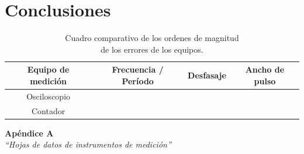 \documentclass{article}
\begin{document}
\section{Conclusiones}

\begin{table}[!hbt]
	\begin{center}
		\begin{tabular}{|c|c|c|c|} \hline
			\textbf{Equipo de medición} & \textbf{Frecuencia / Período} & \textbf{Desfasaje} & \textbf{Ancho de pulso} \\\hline
			Osciloscopio &  &  &  \\\hline
			Contador &  &  &  \\\hline
		\end{tabular}

	\caption{Cuadro comparativo de los ordenes de magnitud\\ de los errores de los equipos.}
	\end{center}
\end{table}
\medskip
	


\newpage \textit{}
\newpage



\newpage
\vspace*{4cm}
\begin{center}
	\textbf{\Huge{Apéndice A}} \\
	\bigskip\bigskip
	\Large{\textit{``Hojas de datos de instrumentos de medición''}}
\end{center}


\newpage \textit{}
\newpage
\end{document}
